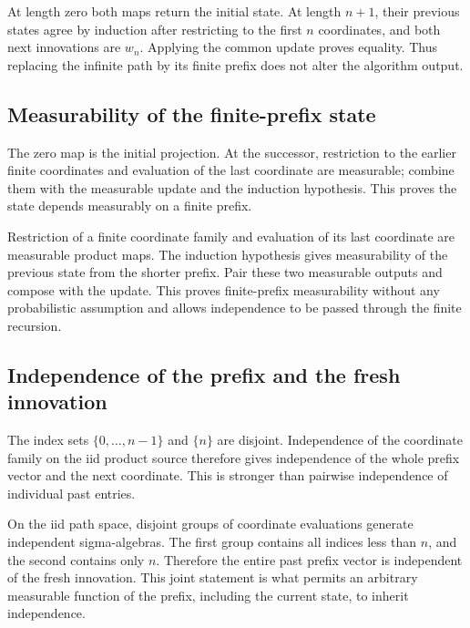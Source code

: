 \documentclass[11pt,a4paper]{report}
\begin{document}
At length zero both maps return the initial state. At length \(n+1\), their previous states agree by induction after restricting to the first \(n\) coordinates, and both next innovations are \(w_n\). Applying the common update proves equality. Thus replacing the infinite path by its finite prefix does not alter the algorithm output.

\subsection{\texorpdfstring{Measurability of the finite-prefix state}{Measurability of the finite-prefix state}}
\label{report-step-UnadjustedLangevin-MarkovLaw-lean-3}


The zero map is the initial projection. At the successor, restriction to the earlier finite coordinates and evaluation of the last coordinate are measurable; combine them with the measurable update and the induction hypothesis. This proves the state depends measurably on a finite prefix.



Restriction of a finite coordinate family and evaluation of its last coordinate are measurable product maps. The induction hypothesis gives measurability of the previous state from the shorter prefix. Pair these two measurable outputs and compose with the update. This proves finite-prefix measurability without any probabilistic assumption and allows independence to be passed through the finite recursion.

\subsection{\texorpdfstring{Independence of the prefix and the fresh innovation}{Independence of the prefix and the fresh innovation}}
\label{report-step-UnadjustedLangevin-MarkovLaw-lean-4}


The index sets \(\{0,\ldots,n-1\}\) and \(\{n\}\) are disjoint. Independence of the coordinate family on the iid product source therefore gives independence of the whole prefix vector and the next coordinate. This is stronger than pairwise independence of individual past entries.



On the iid path space, disjoint groups of coordinate evaluations generate independent sigma-algebras. The first group contains all indices less than \(n\), and the second contains only \(n\). Therefore the entire past prefix vector is independent of the fresh innovation. This joint statement is what permits an arbitrary measurable function of the prefix, including the current state, to inherit independence.
\end{document}
